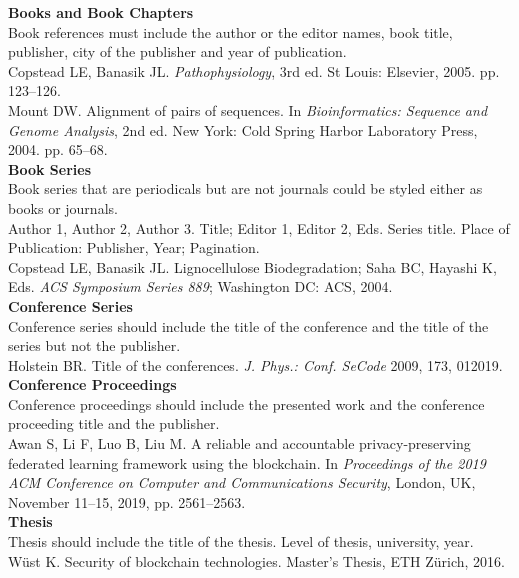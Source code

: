 \documentclass{ELSP}
\begin{document}
\noindent \textbf{Books and Book Chapters}\\
Book references must include the author or the editor names, book title, publisher, city of the publisher and year of publication.\\
\noindent [1] Copstead LE, Banasik JL. \textit{Pathophysiology}, 3rd ed. St Louis: Elsevier, 2005. pp. 123--126.\\
\noindent [2] Mount DW. Alignment of pairs of sequences. In \textit{Bioinformatics: Sequence and Genome Analysis}, 2nd ed. New York: Cold Spring Harbor Laboratory Press, 2004. pp. 65--68.\\

\noindent \textbf{Book Series}\\
\noindent Book series that are periodicals but are not journals could be styled either as books or journals. \\
\noindent Author 1, Author 2,  Author 3. Title; Editor 1, Editor 2, Eds. Series title. Place of Publication: Publisher,  Year; Pagination. \\
\noindent [1] Copstead LE, Banasik JL. Lignocellulose Biodegradation; Saha BC, Hayashi K, Eds. \textit{ACS Symposium Series 889}; Washington DC: ACS, 2004.\\

\noindent \textbf{Conference Series}\\
\noindent Conference series should include the title of the conference and the title of the series but not the publisher.\\
\noindent [1] Holstein BR. Title of the conferences. \textit{J. Phys.: Conf. SeCode} 2009, 173, 012019.\\

\noindent \textbf{Conference Proceedings}\\
\noindent Conference proceedings should include the presented work and the conference proceeding title and the publisher. \\
\noindent [1] Awan S, Li F, Luo B, Liu M. A reliable and accountable privacy-preserving federated learning framework using the blockchain. In \textit{Proceedings \noindent of the 2019 ACM Conference on Computer and Communications Security}, London, UK, November 11--15, 2019, pp. 2561--2563.\\

\noindent \textbf{Thesis}\\
\noindent Thesis should include the title of the thesis. Level of thesis, university, year. \\
\noindent [1] Wüst K. Security of blockchain technologies. Master’s Thesis, ETH Zürich, 2016.\\
\end{document}
